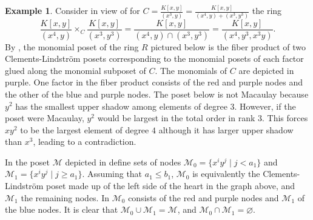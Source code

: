 \documentclass[11pt, reqno]{amsart}
\newcommand{\M}{{\mathcal M}}
\theoremstyle{plain} %
\theoremstyle{definition}
\newtheorem{ex}[thm]{Example}
\theoremstyle{remark}
\numberwithin{equation}{section}  %
\begin{document}
\begin{ex}\label{ex: heart}
Consider in view of  for  $C=\frac{K[x,y]}{(x^3,y)}=\frac{K[x,y]}{(x^4,y)+(x^3,y^3)}$ the  ring  
\[
\frac{K[x,y]}{(x^4,y)} \times_C \frac{K[x,y]}{(x^3,y^3)}= \frac{K[x,y]}{(x^4,y)\cap(x^3,y^3)} = \frac{K[x,y]}{(x^4,y^3,x^3y)}.
\]
By , the monomial poset of the ring $R$ pictured below is the fiber product of two Clements-Lindstr\"om posets corresponding to the monomial posets of each factor glued along the monomial subposet of $C$. The monomials of $C$ are depicted in purple.  One factor in the fiber product consists of the red and purple nodes and the other of the blue and purple nodes. The poset below is not Macaulay because $y^2$ has the smallest upper shadow among elements of degree 3. However, if the poset were Macaulay, $y^2$ would be largest in the total order in rank 3. This forces $xy^2$ to be the largest element of degree $4$ although it has larger upper shadow than $x^3$, leading to a contradiction.

\begin{center}

\end{center}
\end{ex}




 

In the poset $\M$ depicted in  define sets of nodes $\M_0 = \{x^iy^j \mid j < a_1\}$  and $\M_1 = \{x^iy^j \mid j \geq a_1\}$. Assuming that $a_1\leq b_1$, $\M_0$ is equivalently the Clements-Lindstr\"om poset made up of the left side of the heart in the graph above, and $\M_1$ the remaining nodes. In  $\M_0$ consists of the red and purple nodes and $\M_1$ of the blue nodes. It is clear that $\M_0 \cup \M_1 = \M$, and $\M_0 \cap \M_1 = \varnothing$. 
\end{document}

